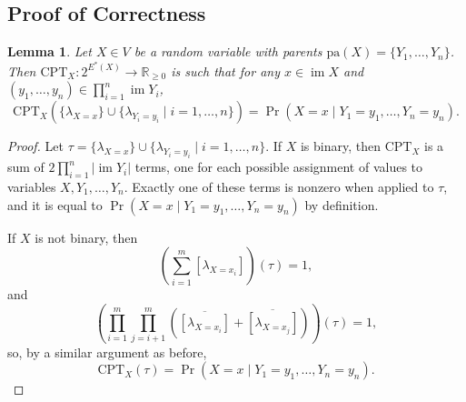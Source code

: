 \documentclass{article}
\newtheorem{lemma}{Lemma}
\theoremstyle{definition}
\theoremstyle{remark}
\DeclareMathOperator{\im}{im}
\begin{document}

\subsection{Proof of Correctness}

\begin{lemma} \label{lemma:cpt}
  Let $X \in V$ be a random variable with parents $\mathrm{pa}(X) = \{ Y_1,
  \dots, Y_n \}$. Then $\mathrm{CPT}_X\colon 2^{E^*(X)} \to \mathbb{R}_{\ge 0}$
  is such that for any $x \in \im X$ and $(y_1, \dots, y_n) \in \prod_{i=1}^n
  \im Y_i$,
  \[
    \mathrm{CPT}_X (\{ \lambda_{X=x} \} \cup \{ \lambda_{Y_i=y_i} \mid i = 1,
    \dots, n \}) = \Pr(X = x \mid Y_1 = y_1, \dots, Y_n = y_n).
  \]
\end{lemma}
\begin{proof}
  Let $\tau = \{ \lambda_{X=x} \} \cup \{ \lambda_{Y_i=y_i} \mid i = 1, \dots, n
  \}$. If $X$ is binary, then $\mathrm{CPT}_X$ is a sum of $2\prod_{i=1}^n |\im
  Y_i|$ terms, one for each possible assignment of values to variables $X, Y_1,
  \dots, Y_n$. Exactly one of these terms is nonzero when applied to $\tau$, and
  it is equal to $\Pr(X = x \mid Y_1 = y_1, \dots, Y_n = y_n)$ by definition.

  If $X$ is not binary, then
  \[
    \left( \sum_{i=1}^m [\lambda_{X = x_i}] \right)(\tau) = 1,
  \]
  and
  \[
    \left( \prod_{i=1}^m \prod_{j=i+1}^m (\overline{[\lambda_{X = x_i}]} +
      \overline{[\lambda_{X = x_j}]}) \right)(\tau) = 1,
  \]
  so, by a similar argument as before,
  \[
    \mathrm{CPT}_X(\tau) = \Pr(X = x \mid Y_1 = y_1, \dots, Y_n = y_n).
  \]
\end{proof}
\end{document}
